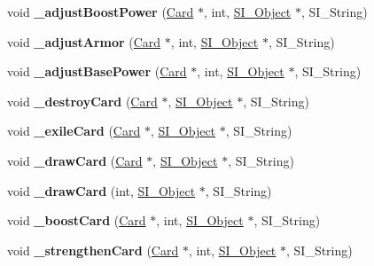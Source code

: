 \begin{DoxyCompactItemize}
void {\bfseries \+\_\+adjust\+Boost\+Power} (\hyperlink{class_card}{Card} $\ast$, int, \hyperlink{class_s_i___object}{S\+I\+\_\+\+Object} $\ast$, S\+I\+\_\+\+String)
\item 
\mbox{\label{class_field_acfe9521506e20a022347b5f9659a9c5d}} 
void {\bfseries \+\_\+adjust\+Armor} (\hyperlink{class_card}{Card} $\ast$, int, \hyperlink{class_s_i___object}{S\+I\+\_\+\+Object} $\ast$, S\+I\+\_\+\+String)
\item 
\mbox{\label{class_field_a15a7f6b26c5f015aa28f3a144e0dad9b}} 
void {\bfseries \+\_\+adjust\+Base\+Power} (\hyperlink{class_card}{Card} $\ast$, int, \hyperlink{class_s_i___object}{S\+I\+\_\+\+Object} $\ast$, S\+I\+\_\+\+String)
\item 
\mbox{\label{class_field_a713346d3faad600750e4870a6dfe7d7f}} 
void {\bfseries \+\_\+destroy\+Card} (\hyperlink{class_card}{Card} $\ast$, \hyperlink{class_s_i___object}{S\+I\+\_\+\+Object} $\ast$, S\+I\+\_\+\+String)
\item 
\mbox{\label{class_field_a3ee5ec169c1d3abb1f597f7f2c6421e1}} 
void {\bfseries \+\_\+exile\+Card} (\hyperlink{class_card}{Card} $\ast$, \hyperlink{class_s_i___object}{S\+I\+\_\+\+Object} $\ast$, S\+I\+\_\+\+String)
\item 
\mbox{\label{class_field_aa20b0f1a6e9ec0c89164f2fe2b8715ef}} 
void {\bfseries \+\_\+draw\+Card} (\hyperlink{class_card}{Card} $\ast$, \hyperlink{class_s_i___object}{S\+I\+\_\+\+Object} $\ast$, S\+I\+\_\+\+String)
\item 
\mbox{\label{class_field_a3eb6669f724d3e1b2376bb72fa769dd2}} 
void {\bfseries \+\_\+draw\+Card} (int, \hyperlink{class_s_i___object}{S\+I\+\_\+\+Object} $\ast$, S\+I\+\_\+\+String)
\item 
\mbox{\label{class_field_a7a538ad52f1b474c17592106641ce573}} 
void {\bfseries \+\_\+boost\+Card} (\hyperlink{class_card}{Card} $\ast$, int, \hyperlink{class_s_i___object}{S\+I\+\_\+\+Object} $\ast$, S\+I\+\_\+\+String)
\item 
\mbox{\label{class_field_a643a62cbf2e6976cd7c2491fb381e2e6}} 
void {\bfseries \+\_\+strengthen\+Card} (\hyperlink{class_card}{Card} $\ast$, int, \hyperlink{class_s_i___object}{S\+I\+\_\+\+Object} $\ast$, S\+I\+\_\+\+String)

\end{DoxyCompactItemize}
